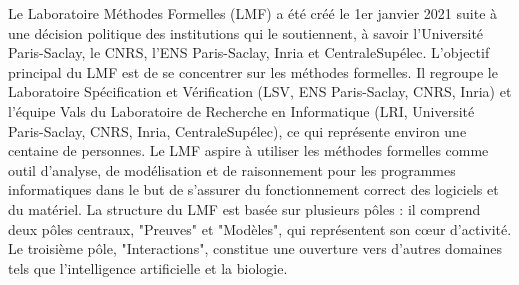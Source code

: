 \documentclass[titlepage,draft]{article}
\begin{document}
Le Laboratoire Méthodes Formelles (LMF) a été créé le 1er janvier 2021 suite à une décision politique des institutions qui le soutiennent, à savoir l'Université Paris-Saclay, le CNRS, l'ENS Paris-Saclay, Inria et CentraleSupélec. L'objectif principal du LMF est de se concentrer sur les méthodes formelles. Il regroupe le Laboratoire Spécification et Vérification (LSV, ENS Paris-Saclay, CNRS, Inria) et l'équipe Vals du Laboratoire de Recherche en Informatique (LRI, Université Paris-Saclay, CNRS, Inria, CentraleSupélec), ce qui représente environ une centaine de personnes.
Le LMF aspire à utiliser les méthodes formelles comme outil d'analyse, de modélisation et de raisonnement pour les programmes informatiques dans le but de s'assurer du fonctionnement correct des logiciels et du matériel.
La structure du LMF est basée sur plusieurs pôles : il comprend deux pôles centraux, "Preuves" et "Modèles", qui représentent son cœur d'activité. Le troisième pôle, "Interactions", constitue une ouverture vers d'autres domaines tels que l'intelligence artificielle et la biologie.

\newpage


\end{document}
